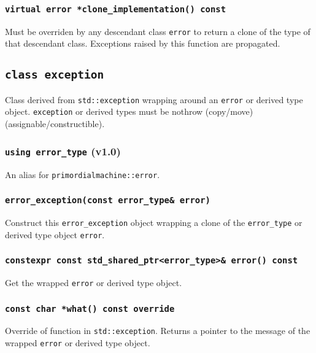 \documentclass[oneside]{article}
\begin{document}
\subsubsection{\texttt{virtual error *clone\_implementation() const}}
Must be overriden by any descendant class \texttt{error} to return a clone of the type of that descendant class.
Exceptions raised by this function are propagated.
\subsection{\texttt{class exception}}
Class derived from \texttt{std::exception} wrapping around an \texttt{error} or derived type
object. \texttt{exception} or derived types must be nothrow (copy/move) (assignable/constructible).

\subsubsection{\texttt{using error\_type} (v1.0)}
An alias for \lstinline{primordialmachine::error}.

\subsubsection{\texttt{error\_exception(const error\_type\& error)}}
Construct this \texttt{error\_exception} object wrapping a clone of the \texttt{error\_type} or
derived type object \texttt{error}.

\subsubsection{\texttt{constexpr const std\_shared\_ptr\textless{}error\_type\textgreater{}\& error() const}}
Get the wrapped \texttt{error} or derived type object.

\subsubsection{\texttt{const char *what() const override}}
Override of function in \texttt{std::exception}.
Returns a pointer to the message of the wrapped \texttt{error} or derived type object.
\end{document}
